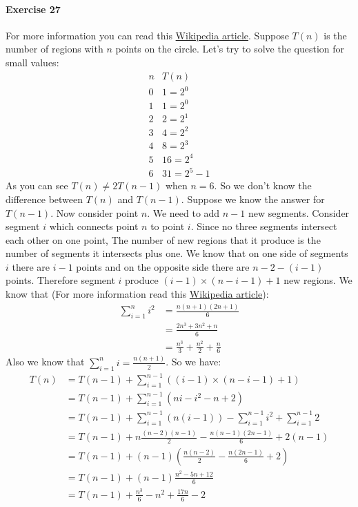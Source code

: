 \documentclass{book}
\begin{document}
	\paragraph{Exercise 27}
	For more information you can read this \href{https://en.wikipedia.org/wiki/Dividing_a_circle_into_areas}{Wikipedia article}. Suppose $T(n)$ is the number of regions with $n$ points on the circle. Let's try to solve the question for small values:
	\begin{equation*}
		\begin{matrix}
			n & T(n) \\
			0 & 1 = 2^0 \\
			1 & 1 = 2^0 \\
			2 & 2 = 2^1 \\
			3 & 4 = 2^2 \\
			4 & 8 = 2^3 \\
			5 & 16 = 2^4 \\
			6 & 31 = 2^5 - 1
		\end{matrix}
	\end{equation*}
	As you can see $T(n) \ne 2T(n - 1)$ when $n = 6$. So we don't know the difference between $T(n)$ and $T(n - 1)$. Suppose we know the answer for $T(n - 1)$. Now consider point $n$. We need to add $n -1$ new segments. Consider segment $i$ which connects point $n$ to point $i$. Since no three segments intersect each other on one point, The number of new regions that it produce is the number of segments it intersects plus one. We know that on one side of segments $i$ there are $i - 1$ points and on the opposite side there are $n - 2 - (i - 1)$ points. Therefore segment $i$ produce $(i - 1) \times (n - i - 1) + 1$ new regions. We know that (For more information read this \href{https://en.wikipedia.org/wiki/Square_pyramidal_number}{Wikipedia article}):
	\begin{equation*}
		\begin{split}
			\sum_{i = 1}^{n}{i^2} &= \frac{n(n + 1)(2n + 1)}{6}\\
			&= \frac{2n^3+3n^2+n}{6}\\
			&= \frac{n^3}{3} + \frac{n^2}{2} + \frac{n}{6}
		\end{split}
	\end{equation*}
	Also we know that $\sum_{i = 1}^{n}{i} = \frac{n(n + 1)}{2}$. So we have:
	\begin{equation*}
		\begin{split}
			T(n) &= T(n - 1) + \sum_{i = 1}^{n - 1}{((i - 1) \times (n - i - 1) + 1)} \\
			&= T(n - 1) + \sum_{i = 1}^{n - 1}{(ni - i^2 - n + 2)} \\
			&= T(n - 1) + \sum_{i = 1}^{n - 1}{(n(i - 1))} - \sum_{i = 1}^{n - 1}{i^2} + \sum_{i = 1}^{n - 1}{2} \\
			&= T(n - 1) + n \frac{(n - 2)(n - 1)}{2} -\frac{n (n - 1)(2n - 1)}{6} + 2(n - 1) \\
			&= T(n - 1) + (n - 1)(\frac{n(n - 2)}{2} - \frac{n(2n - 1)}{6} + 2) \\
			&= T(n - 1) + (n - 1)\frac{n^2 - 5n + 12}{6} \\
			&= T(n - 1) + \frac{n^3}{6} - n^2 + \frac{17n}{6} - 2
		\end{split}
	\end{equation*}
\end{document}
